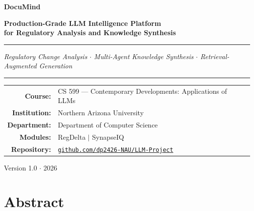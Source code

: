 \documentclass[12pt,letterpaper]{article}
\begin{document}
\begin{titlepage}
  \centering
  \vspace*{2.5cm}

  {\Huge\bfseries\color{navyblue} DocuMind\par}
  \vspace{0.6cm}
  {\Large\bfseries\color{accentblue}
    Production-Grade LLM Intelligence Platform \\
    for Regulatory Analysis and Knowledge Synthesis\par}
  \vspace{1.2cm}

  \noindent\rule{\textwidth}{1.5pt}
  \vspace{0.4cm}

  {\large\itshape
    Regulatory Change Analysis $\cdot$
    Multi-Agent Knowledge Synthesis $\cdot$
    Retrieval-Augmented Generation\par}
  \vspace{0.4cm}
  \noindent\rule{\textwidth}{0.4pt}

  \vspace{1.8cm}

  \begin{tabular}{rl}
    \textbf{Course:}      & CS 599 --- Contemporary Developments: Applications of LLMs \\[4pt]
    \textbf{Institution:} & Northern Arizona University \\[4pt]
    \textbf{Department:}  & Department of Computer Science \\[4pt]
    \textbf{Modules:}     & RegDelta $|$ SynapseIQ \\[4pt]
    \textbf{Repository:}  &
      \href{https://github.com/dp2426-NAU/LLM-Project}
           {\texttt{github.com/dp2426-NAU/LLM-Project}} \\
  \end{tabular}

  \vfill
  {\small\color{codegray} Version 1.0 $\cdot$ 2026}
\end{titlepage}

\tableofcontents
\newpage

\section{Abstract}
\end{document}
